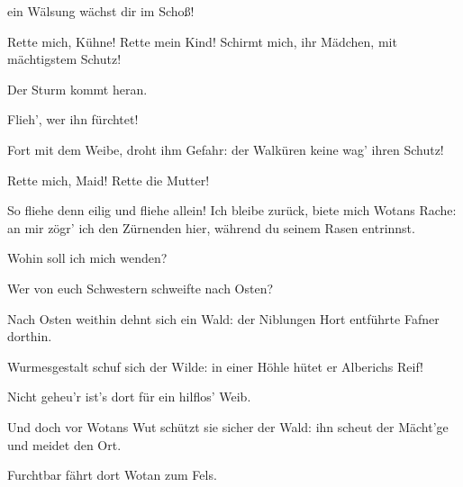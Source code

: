 \begin{drama}
ein Wälsung wächst dir im Schoß!
 

\Sieglindespeaks


Rette mich, Kühne! Rette mein Kind!
Schirmt mich, ihr Mädchen, mit mächtigstem Schutz!
 




\Waltrautespeaks


Der Sturm kommt heran.
 

\Ortlindespeaks


Flieh', wer ihn fürchtet!
 

Fort mit dem Weibe, droht ihm Gefahr:
der Walküren keine wag' ihren Schutz!
 

\Sieglindespeaks


Rette mich, Maid! Rette die Mutter!
 

\Brunnhildespeaks


So fliehe denn eilig und fliehe allein!
Ich bleibe zurück, biete mich Wotans Rache:
an mir zögr' ich den Zürnenden hier,
während du seinem Rasen entrinnst.
 

\Sieglindespeaks
Wohin soll ich mich wenden?
 

\Brunnhildespeaks
Wer von euch Schwestern schweifte nach Osten?
 

\Siegrunespeaks
Nach Osten weithin dehnt sich ein Wald:
der Niblungen Hort entführte Fafner dorthin.
 

\Schwertleitespeaks
Wurmesgestalt schuf sich der Wilde:
in einer Höhle hütet er Alberichs Reif!
 

\Grimgerdespeaks
Nicht geheu'r ist's dort für ein hilflos' Weib.
 

\Brunnhildespeaks
Und doch vor Wotans Wut schützt sie sicher der Wald:
ihn scheut der Mächt'ge und meidet den Ort.
 

\Waltrautespeaks


Furchtbar fährt
dort Wotan zum Fels.
 


\end{drama}
